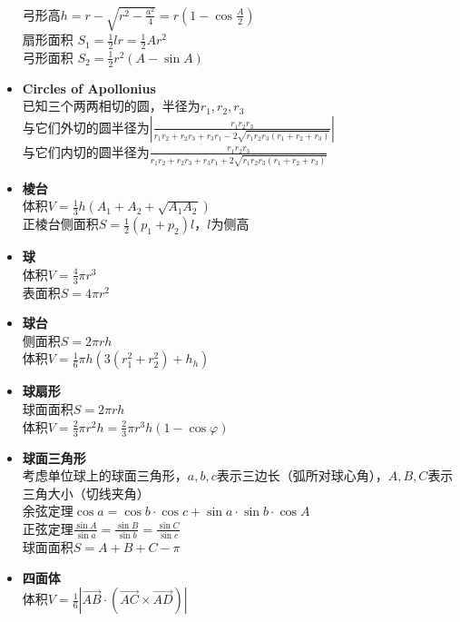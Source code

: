 \begin{itemize}[nosep, wide=0pt]
            \\弓形高$ h = r - \sqrt{r^2 - \frac{a^2}{4}} = r (1 - \cos \frac{A}{2}) $
            \\扇形面积 $ S_1 = \frac{1}{2} l r = \frac{1}{2} A r^2 $
            \\弓形面积 $ S_2 = \frac{1}{2} r^2 (A - \sin A) $
        \item \textbf{Circles of Apollonius}
            \\已知三个两两相切的圆，半径为$ r_1, r_2, r_3 $
            \\与它们外切的圆半径为$ \left| \frac{r_1 r_2 r_3}{r_1 r_2 + r_2 r_3 + r_3 r_1 - 2 \sqrt{r_1 r_2 r_3 (r_1 + r_2 + r_3)}} \right| $
            \\与它们内切的圆半径为$ \frac{r_1 r_2 r_3}{r_1 r_2 + r_2 r_3 + r_3 r_1 + 2 \sqrt{r_1 r_2 r_3 (r_1 + r_2 + r_3)}} $
        \item \textbf{棱台}
            \\体积$ V = \frac{1}{3} h (A_1 + A_2 + \sqrt{A_1 A_2}) $
            \\正棱台侧面积$ S = \frac{1}{2} (p_1 + p_2) l $，$ l $为侧高
        \item \textbf{球}
            \\体积$ V = \frac{4}{3} \pi r^3 $
            \\表面积$ S = 4 \pi r^2 $
        \item \textbf{球台}
            \\侧面积$ S = 2 \pi r h $
            \\体积$ V = \frac{1}{6} \pi h (3(r_1^2 + r_2^2) + h_h) $
        \item \textbf{球扇形}
            \\球面面积$ S = 2 \pi r h $
            \\体积$ V = \frac{2}{3} \pi r^2 h = \frac{2}{3} \pi r^3 h (1 - \cos \varphi) $
        \item \textbf{球面三角形}
            \\考虑单位球上的球面三角形，$ a, b, c $表示三边长（弧所对球心角），$ A, B, C $表示三角大小（切线夹角）
            \\余弦定理$ \cos a = \cos b \cdot \cos c + \sin a \cdot \sin b \cdot \cos A $
            \\正弦定理$ \frac{\sin A}{\sin a} = \frac{\sin B}{\sin b} = \frac{\sin C}{\sin c} $
            \\球面面积$ S = A + B + C - \pi $
        \item \textbf{四面体}
            \\体积$ V = \frac{1}{6} \left| \overrightarrow{AB} \cdot (\overrightarrow{AC} \times \overrightarrow{AD}) \right| $
    \end{itemize}
